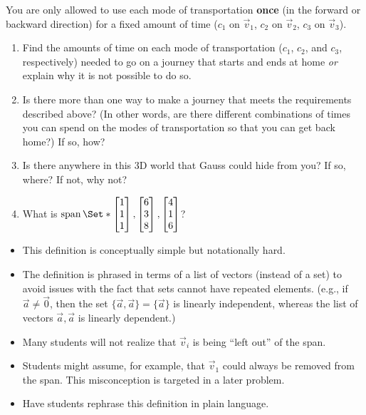 \documentclass{workbook}
\begin{document}
\begin{iola}
\begin{slide}
You are only allowed to use each mode of transportation \textbf{once}
(in the forward or backward direction) for a fixed amount of time ($c_1$
on $\vec v_1$, $c_2$ on $\vec v_2$, $c_3$ on $\vec v_3$).

\vspace{5mm}


\begin{enumerate}
	\item  Find the amounts of time on each mode of transportation ($c_1$, $c_2$,
		and $c_3$, respectively) needed to go on a journey that starts and ends
		at home \emph{or} explain why it is not possible to do so.

	\item Is there more than one way to make a journey that meets the
		requirements described above? (In other words, are there different
		combinations of times you can spend on the modes of transportation so
		that you can get back home?) If so, how?

	\item Is there anywhere in this 3D world that Gauss
		could hide from you? If so, where? If not, why not?

	\item What is $\Span\Set*{\mat{1\\1\\1},\mat{6\\3\\8},\mat{4\\1\\6}}$?

\end{enumerate}
\end{slide}
\end{iola}


	\begin{annotation}
		\begin{goals}
		\end{goals}

		\begin{notes}
			\begin{itemize}
				\item This definition is conceptually simple but notationally hard.
				\item The definition is phrased in terms of a list of vectors (instead of
					a set) to avoid issues with the fact that sets cannot have repeated elements. (e.g.,
					if $\vec a\neq \vec 0$, then the set $\{\vec a,\vec a\}=\{\vec a\}$ is linearly
					independent, whereas the list of vectors $\vec a,\vec a$ is linearly dependent.)
				\item Many students will not realize that $\vec v_i$ is being ``left out''
					of the span.
				\item Students might assume, for example, that $\vec v_1$ could always be removed
					from the span. This misconception is targeted in a later problem.
				\item Have students rephrase this definition in plain language.
			\end{itemize}
		\end{notes}
	\end{annotation}
\end{document}
